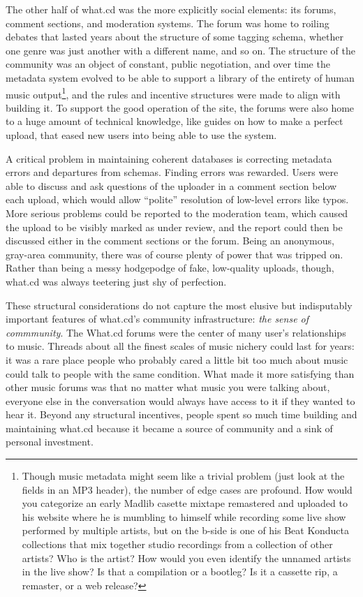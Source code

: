 \documentclass[10pt]{article}
\begin{document}
\begin{multicols}{2}
The other half of what.cd was the more explicitly social elements: its
forums, comment sections, and moderation systems. The forum was home to
roiling debates that lasted years about the structure of some tagging
schema, whether one genre was just another with a different name, and so
on. The structure of the community was an object of constant, public
negotiation, and over time the metadata system evolved to be able to
support a library of the entirety of human music output\footnote{Though
  music metadata might seem like a trivial problem (just look at the
  fields in an MP3 header), the number of edge cases are profound. How
  would you categorize an early Madlib casette mixtape remastered and
  uploaded to his website where he is mumbling to himself while
  recording some live show performed by multiple artists, but on the
  b-side is one of his Beat Konducta collections that mix together
  studio recordings from a collection of other artists? Who is the
  artist? How would you even identify the unnamed artists in the live
  show? Is that a compilation or a bootleg? Is it a cassette rip, a
  remaster, or a web release?}, and the rules and incentive structures
were made to align with building it. To support the good operation of
the site, the forums were also home to a huge amount of technical
knowledge, like guides on how to make a perfect upload, that eased new
users into being able to use the system.

A critical problem in maintaining coherent databases is correcting
metadata errors and departures from schemas. Finding errors was
rewarded. Users were able to discuss and ask questions of the uploader
in a comment section below each upload, which would allow ``polite''
resolution of low-level errors like typos. More serious problems could
be reported to the moderation team, which caused the upload to be
visibly marked as under review, and the report could then be discussed
either in the comment sections or the forum. Being an anonymous,
gray-area community, there was of course plenty of power that was
tripped on. Rather than being a messy hodgepodge of fake, low-quality
uploads, though, what.cd was always teetering just shy of perfection.

These structural considerations do not capture the most elusive but
indisputably important features of what.cd's community infrastructure:
\emph{the sense of commmunity}. The What.cd forums were the center of
many user's relationships to music. Threads about all the finest scales
of music nichery could last for years: it was a rare place people who
probably cared a little bit too much about music could talk to people
with the same condition. What made it more satisfying than other music
forums was that no matter what music you were talking about, everyone
else in the conversation would always have access to it if they wanted
to hear it. Beyond any structural incentives, people spent so much time
building and maintaining what.cd because it became a source of community
and a sink of personal investment.


\end{multicols}
\end{document}

